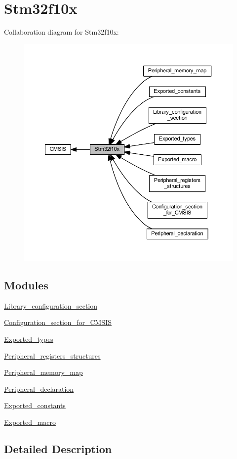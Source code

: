 \hypertarget{group__stm32f10x}{}\section{Stm32f10x}
\label{group__stm32f10x}
Collaboration diagram for Stm32f10x\+:
\nopagebreak
\begin{figure}[H]
\begin{center}
\leavevmode
\includegraphics[width=350pt]{group__stm32f10x}
\end{center}
\end{figure}
\subsection*{Modules}
\begin{DoxyCompactItemize}
\item 
\hyperlink{group___library__configuration__section}{Library\+\_\+configuration\+\_\+section}
\item 
\hyperlink{group___configuration__section__for___c_m_s_i_s}{Configuration\+\_\+section\+\_\+for\+\_\+\+C\+M\+S\+IS}
\item 
\hyperlink{group___exported__types}{Exported\+\_\+types}
\item 
\hyperlink{group___peripheral__registers__structures}{Peripheral\+\_\+registers\+\_\+structures}
\item 
\hyperlink{group___peripheral__memory__map}{Peripheral\+\_\+memory\+\_\+map}
\item 
\hyperlink{group___peripheral__declaration}{Peripheral\+\_\+declaration}
\item 
\hyperlink{group___exported__constants}{Exported\+\_\+constants}
\item 
\hyperlink{group___exported__macro}{Exported\+\_\+macro}
\end{DoxyCompactItemize}


\subsection{Detailed Description}
